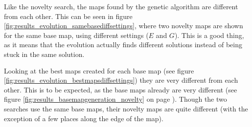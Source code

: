 Like the novelty search, the maps found by the genetic algorithm are different from each other. This can be seen in figure \ref{fig:results_evolution_samebasediffsettings}, where two novelty maps are shown for the same base map, using different settings ($E$ and $G$). This is a good thing, as it means that the evolution actually finds different solutions instead of being stuck in the same solution.


Looking at the best maps created for each base map (see figure \ref{fig:results_evolution_bestmapsdiffsettings}) they are very different from each other. This is to be expected, as the base maps already are very different (see figure \ref{fig:results_basemapgeneration_novelty} on page \pageref{fig:results_basemapgeneration_novelty}). Though the two searches use  the same base maps, their novelty maps are quite different (with the exception of a few places along the edge of the map).


